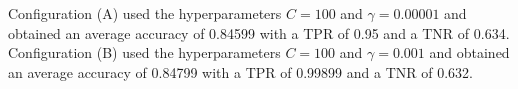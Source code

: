 Configuration (A) used the hyperparameters $C = 100$ and $\gamma = 0.00001$
and obtained an average accuracy of 0.84599 with a \gls{TPR} of 0.95 and a
\gls{TNR} of 0.634. Configuration (B) used the hyperparameters $C = 100$ and
$\gamma = 0.001$ and obtained an average accuracy of 0.84799 with a \gls{TPR}
of 0.99899 and a \gls{TNR} of 0.632.
